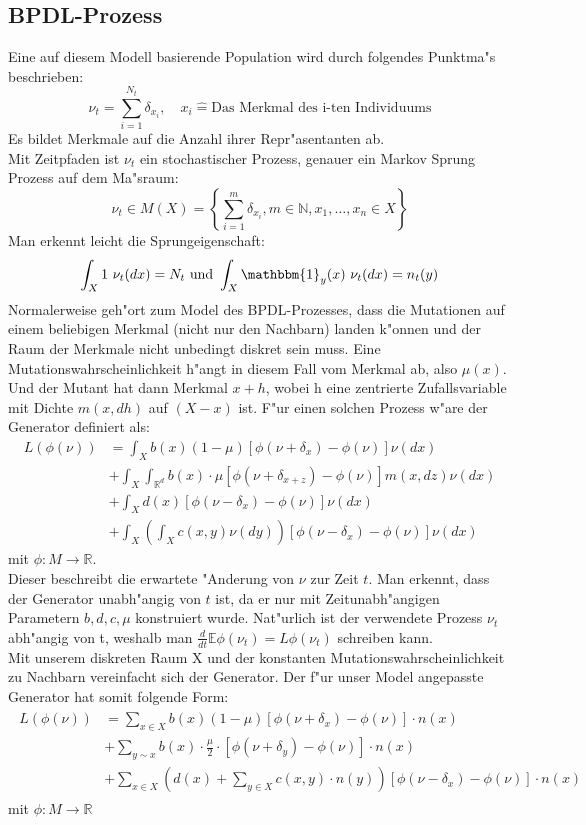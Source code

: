 \documentclass[11pt, a4paper, german]{article}
\theoremstyle{plain}
\begin{document}
	\subsection{BPDL-Prozess}
	Eine auf diesem Modell basierende Population wird durch folgendes Punktma"s beschrieben:
	\[ \nu_t = \sum_{i=1}^{N_t} \delta_{x_i}, \quad x_i \hat{=} \text{Das Merkmal des i-ten Individuums} \]
	Es bildet Merkmale auf die Anzahl ihrer Repr"asentanten ab.\\
	Mit Zeitpfaden ist $ \nu_t $ ein stochastischer Prozess, genauer ein Markov Sprung Prozess auf dem Ma"sraum:
	\[ \nu_t \in M(X) = \left\{ \sum_{i=1}^{m} \delta_{x_i}, m \in \mathbb{N}, x_1, \dots, x_n \in X \right\} \]
	Man erkennt leicht die Sprungeigenschaft:
	\[ \int_X 1 \text{ } \nu_t(dx) = N_t 
	\text{ und }
	\int_X \mathbbm{1}_y(x) \text{ } \nu_t(dx) = n_t(y) \]
	Normalerweise geh"ort zum Model des BPDL-Prozesses, dass die Mutationen auf einem beliebigen Merkmal (nicht nur den Nachbarn) landen k"onnen und der Raum der Merkmale nicht unbedingt diskret sein muss. Eine Mutationswahrscheinlichkeit h"angt in diesem Fall vom Merkmal ab, also $ \mu(x) $. Und der Mutant hat dann Merkmal $ x + h $, wobei h eine zentrierte Zufallsvariable mit Dichte $ m(x,dh) $ auf $ (X - x) $ ist.
	F"ur einen solchen Prozess w"are der Generator definiert als:
	\begin{align*}
		L(\phi(\nu)) &= \int_{X} b(x)(1-\mu)[\phi(\nu + \delta_x) - \phi(\nu)]\nu(dx)\\
					  &+ \int_{X}\int_{\mathbb{R}^d} b(x) \cdot \mu [\phi(\nu + \delta_{x+z}) - \phi(\nu)] m(x,dz) \nu(dx)\\
				  	  &+ \int_{X} d(x)[\phi(\nu - \delta_x) - \phi(\nu)]\nu(dx)\\
				 	  &+ \int_{X} \left( \int_{X} c(x,y) \nu(dy) \right) [\phi(\nu - \delta_x) - \phi(\nu)]\nu(dx)
	\end{align*}
	mit $ \phi: M \to \mathbb{R} $. \\
	Dieser beschreibt die erwartete "Anderung von $ \nu $ zur Zeit $ t $. Man erkennt, dass der Generator unabh"angig von $ t $ ist, da er nur mit Zeitunabh"angigen Parametern $ b, d, c, \mu $ konstruiert wurde. Nat"urlich ist der verwendete Prozess $ \nu_t $ abh"angig von t, weshalb man $ \frac{d}{dt}\mathbb{E}\phi(\nu_t) = L\phi(\nu_t) $ schreiben kann.\\
	Mit unserem diskreten Raum X und der konstanten Mutationswahrscheinlichkeit zu Nachbarn vereinfacht sich der Generator. Der f"ur unser Model angepasste Generator hat somit folgende Form:
	\begin{align}
	\begin{split}
		L(\phi(\nu)) &= \sum_{x \in X} b(x)(1-\mu)[\phi(\nu + \delta_{x}) - \phi(\nu)] \cdot n(x)\\
		&+ \sum_{y \sim x}b(x) \cdot \frac{\mu}{2} \cdot 
 [\phi(\nu + \delta_{y}) - \phi(\nu)] \cdot n(x)\\		 
		&+ \sum_{x \in X} \left(d(x) + \sum_{y \in X} c(x,y) \cdot n(y)\right)[\phi(\nu - \delta_{x}) - \phi(\nu)] \cdot n(x) \label{GeneratorDiskret}
	\end{split}
	\end{align}
	mit $ \phi: M \to \mathbb{R} $
\end{document}
